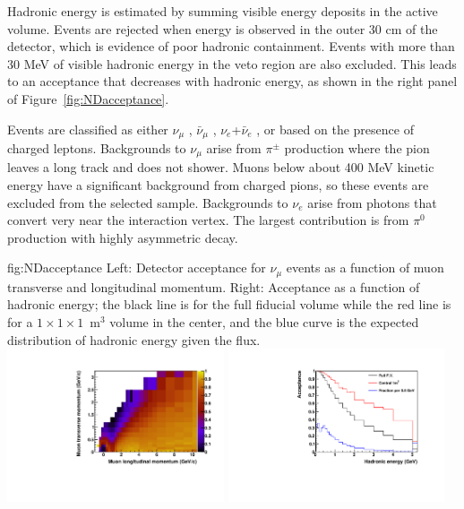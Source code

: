 Hadronic energy is estimated by summing visible energy deposits in the active  volume. Events are rejected when energy is observed in the outer 30 cm of the detector, which is evidence of poor hadronic containment.  Events with more than 30 MeV of visible hadronic energy in the veto region are also excluded.  This leads to an acceptance that decreases with hadronic energy, as shown in the right panel of Figure~\ref{fig:NDacceptance}.


Events are classified as either $\nu_{\mu}$ , $\bar{\nu}_{\mu}$ , $\nu_{e}$+$\bar{\nu}_{e}$ , or  based on the presence of charged leptons. Backgrounds to $\nu_{\mu}$  arise from  $\pi^{\pm}$ production where the pion leaves a long track and does not shower. Muons below about 400 MeV kinetic energy have a significant background from charged pions, so these  events are excluded from the selected sample. Backgrounds to $\nu_{e}$  arise from photons that convert very near the interaction vertex. The largest contribution is from $\pi^{0}$ production with highly asymmetric decay.

\begin{dunefigure}[ND acceptance]{fig:NDacceptance}
{Left: Detector acceptance for $\nu_{\mu}$  events as a function of muon transverse and longitudinal momentum. Right: Acceptance as a function of hadronic energy; the black line is for the full fiducial volume while the red line is for a $1 \times 1 \times 1$~m$^{3}$ volume in the center, and the blue curve is the expected distribution of hadronic energy given the  flux.}
 \includegraphics[width=0.48\textwidth]{graphics/pL_pT_eff.pdf}
 \includegraphics[width=0.48\textwidth]{graphics/Ehad_eff.pdf}
\end{dunefigure}

